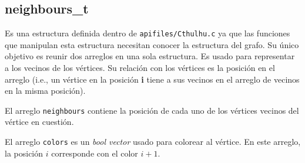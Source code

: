 \documentclass[11pt]{article}   	%
\begin{document}
\subsection{neighbours\_t}
Es una estructura definida dentro de \texttt{apifiles/Cthulhu.c} ya que las
funciones que manipulan esta estructura necesitan conocer la estructura del
grafo. Su único objetivo es reunir dos arreglos en una sola estructura. Es usado
para representar a los vecinos de los vértices. Su relación con los vértices es
la posición en el arreglo (i.e., un vértice en la posición \textbf{i} tiene a sus vecinos
en el arreglo de vecinos en la misma posición).

El arreglo \texttt{neighbours}
contiene la posición de cada uno de los vértices vecinos del vértice en cuestión.

El arreglo \texttt{colors} es un \emph{bool vector} usado para colorear al vértice.
En este arreglo, la posición $i$ corresponde con el color $i+1$.
\end{document}
